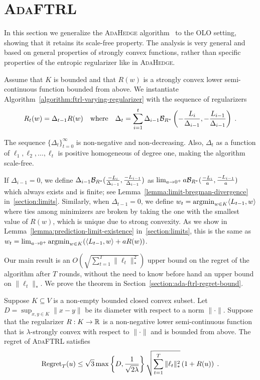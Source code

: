 \section{\textsc{AdaFTRL}}
\label{section:ada-ftrl}

In this section we generalize the \textsc{AdaHedge}
algorithm~\cite{de-Rooij-van-Erven-Grunwald-Koolen-2014} to the OLO setting,
showing that it retains its scale-free property. The analysis is very general
and based on general properties of strongly convex functions, rather than
specific properties of the entropic regularizer like in \textsc{AdaHedge}.

Assume that $K$ is bounded and that $R(w)$ is a strongly convex lower
semi-continuous function bounded from above.  We instantiate
Algorithm~\ref{algorithm:ftrl-varying-regularizer} with the sequence of
regularizers
\begin{equation}
\label{equation:ada-ftrl}
R_t(w) = \Delta_{t-1} R(w)
\quad \text{where}
\quad \Delta_{t}=\sum_{i=1}^{t} \Delta_{i-1} \mathcal{B}_{R^*}\left(- \frac{L_i}{\Delta_{i-1}}, -\frac{L_{i-1}}{\Delta_{i-1}}\right) \; .
\end{equation}

The sequence $\{\Delta_t\}_{t=0}^\infty$ is non-negative and non-decreasing.
Also, $\Delta_t$ as a function of $\ell_1, \ell_2, \dots, \ell_t$ is positive
homogeneous of degree one, making the algorithm scale-free.

If $\Delta_{i-1} = 0$, we define $\Delta_{i-1}
\mathcal{B}_{R^*}(\frac{-L_i}{\Delta_{i-1}}, \frac{-L_{i-1}}{\Delta_{i-1}})$ as
$\lim_{a \to 0^+} a \mathcal{B}_{R^*}(\frac{-L_i}{a}, \frac{-L_{i-1}}{a})$ which
always exists and is finite; see Lemma~\ref{lemma:limit-bregman-divergence}
in~\ref{section:limits}.  Similarly, when $\Delta_{t-1} = 0$, we define $w_t =
\operatorname*{argmin}_{w \in K} \langle L_{t-1}, w \rangle$ where ties among minimizers are
broken by taking the one with the smallest value of $R(w)$, which is unique due
to strong convexity. As we show in Lemma~\ref{lemma:prediction-limit-existence}
in~\ref{section:limits}, this is the same as $w_t = \lim_{a \to 0^+} \operatorname*{argmin}_{w
\in K} (\langle L_{t-1}, w \rangle + aR(w))$.

Our main result is an $O(\sqrt{\sum_{t=1}^T \|\ell_t\|_*^2})$ upper bound on
the regret of the algorithm after $T$ rounds, without the need to know before
hand an upper bound on $\|\ell_t\|_*$.  We prove the theorem in
Section~\ref{section:ada-ftrl-regret-bound}.

\begin{theorem}
\label{theorem:ada-ftrl-regret-bound}
Suppose $K \subseteq V$ is a non-empty bounded closed convex subset. Let $D =
\sup_{x,y \in K} \|x - y\|$ be its diameter with respect to a norm $\|\cdot\|$.
Suppose that the regularizer $R:K \to \mathbb{R}$ is a non-negative lower
semi-continuous function that is $\lambda$-strongly convex with respect to
$\|\cdot\|$ and is bounded from above.  The regret of \textsc{AdaFTRL} satisfies
$$
\operatorname{Regret}_T(u)
\le \sqrt{3} \max\left\{D, \frac{1}{\sqrt{2\lambda}} \right\}
    \sqrt{\sum_{t=1}^T \|\ell_t\|_*^2} \left(1 + R(u) \right) \; .
$$
\end{theorem}

